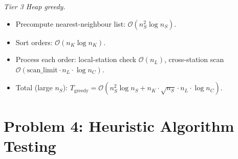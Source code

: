 \documentclass[a4paper, 12pt]{article}
\begin{document}
    \smallskip
    \noindent\textit{Tier 3 Heap greedy.}
    \begin{itemize}
        \item Precompute nearest-neighbour list: $\mathcal{O}(n_S^2\log n_S)$.
        \item Sort orders: $\mathcal{O}(n_K\log n_K)$.
        \item Process each order: local-station check $\mathcal{O}(n_L)$, cross-station scan $\mathcal{O}(\text{scan\_limit}\cdot n_L\cdot \log n_C)$.
        \item Total (large $n_S$): $T_{\text{greedy}} = \mathcal{O}(n_S^2\log n_S + n_K\cdot \sqrt{n_S}\cdot n_L\cdot \log n_C)$.
    \end{itemize}






    \section{Problem 4: Heuristic Algorithm Testing}
\end{document}
